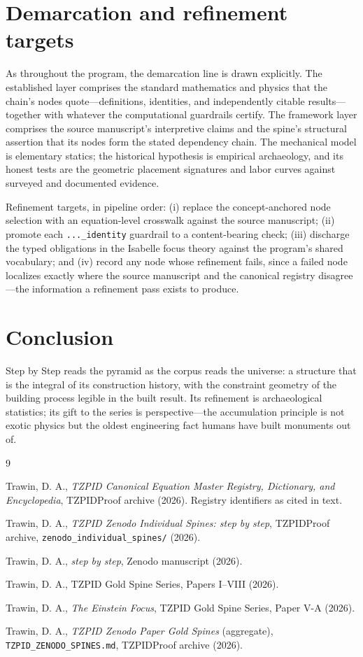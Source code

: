 \documentclass[11pt]{article}
\theoremstyle{remark}
\begin{document}
\section{Demarcation and refinement targets}
\label{sec:demarc}

As throughout the program, the demarcation line is drawn explicitly. The established layer comprises the standard mathematics and physics that the chain's nodes quote---definitions, identities, and independently citable results---together with whatever the computational guardrails certify. The framework layer comprises the source manuscript's interpretive claims and the spine's structural assertion that its nodes form the stated dependency chain. The mechanical model is elementary statics; the historical hypothesis is empirical archaeology, and its honest tests are the geometric placement signatures and labor curves against surveyed and documented evidence.

Refinement targets, in pipeline order: (i) replace the concept-anchored node selection with an equation-level crosswalk against the source manuscript; (ii) promote each \texttt{...\_identity} guardrail to a content-bearing check; (iii) discharge the typed obligations in the Isabelle focus theory against the program's shared vocabulary; and (iv) record any node whose refinement fails, since a failed node localizes exactly where the source manuscript and the canonical registry disagree---the information a refinement pass exists to produce.

\section{Conclusion}
\label{sec:conc}

Step by Step reads the pyramid as the corpus reads the universe: a structure that is the integral of its construction history, with the constraint geometry of the building process legible in the built result. Its refinement is archaeological statistics; its gift to the series is perspective---the accumulation principle is not exotic physics but the oldest engineering fact humans have built monuments out of.

\begin{thebibliography}{9}

 Trawin, D. A., \emph{TZPID Canonical Equation Master Registry, Dictionary, and Encyclopedia}, TZPIDProof archive (2026). Registry identifiers as cited in text.

 Trawin, D. A., \emph{TZPID Zenodo Individual Spines: step by step}, TZPIDProof archive, \texttt{zenodo\_individual\_spines/} (2026).

 Trawin, D. A., \emph{step by step}, Zenodo manuscript (2026).

 Trawin, D. A., TZPID Gold Spine Series, Papers I--VIII (2026).

 Trawin, D. A., \emph{The Einstein Focus}, TZPID Gold Spine Series, Paper V-A (2026).

 Trawin, D. A., \emph{TZPID Zenodo Paper Gold Spines} (aggregate), \texttt{TZPID\_ZENODO\_SPINES.md}, TZPIDProof archive (2026).

\end{thebibliography}
\end{document}
